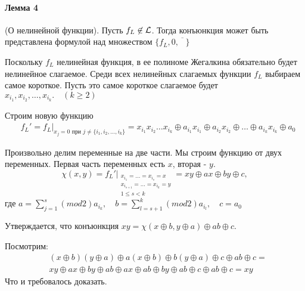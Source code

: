 \paragraph*{Лемма 4} (О нелинейной функции).
Пусть $f_L \not\in {\cal L}$. Тогда конъюнкция может быть представлена формулой
над множеством $\{f_L, 0, \overline{\phantom{A}}\} $ 

\begin{myproof}
Поскольку $f_L$ нелинейная функция, в ее полиноме Жегалкина обязательно будет нелинейное
слагаемое. Среди всех нелинейных слагаемых функции  $f_L$ выбираем самое короткое. Пусть
это самое короткое слагаемое будет  $x_i_1, x_i_2, \ldots, x_i_k. \quad (k \ge 2)$

Строим новую функцию
\begin{align*}
    &f_L' = f_L\bigg|_{x_j = 0 \text{ при } j \neq \{i_1,i_2,\ldots,i_k\} } = x_i_1x_i_2\ldots
    x_i_k \oplus a_i_1x_i_1 \oplus a_i_2x_i_2 \oplus \ldots \oplus a_i_kx_i_k \oplus a_0
\end{align*}

Произвольно делим переменные на две части. Мы строим функцию от двух переменных. Первая
часть переменных есть $x$, вторая -  $y$. 
\[
    \chi(x,y) = f_L'\bigg|_{
        \begin{matrix}
            x_i_1 = \ldots = x_{i_s} = x\\
            x_{i_{s+1}} = \ldots = x_{i_k} = y\\
            1 \le s < k
        \end{matrix}
    } = xy \oplus ax \oplus by \oplus c
,\]
где $a = \sum\limits_{j=1}^{s}(mod 2)a_i_k,\quad b = \sum\limits_{l=s+1}^{k}(mod 2)a_i_l,
\quad c = a_0$

Утверждается, что конъюнкция $xy = \chi(x \oplus b, y \oplus a) \oplus ab \oplus c$.

Посмотрим:
 \begin{align*}
    &(x\oplus b)(y \oplus a) \oplus a(x \oplus b) \oplus b(y \oplus a) \oplus c \oplus ab \oplus c =\\
    & xy \oplus ax \oplus by \oplus ab \oplus ax \oplus ab \oplus by \oplus ab \oplus c \oplus
    ab \oplus c = xy
\end{align*}
Что и требовалось доказать.

\end{myproof}



